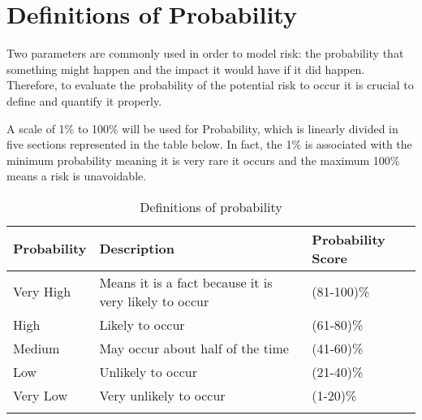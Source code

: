 \section{Definitions of Probability}
\label{3.1}
Two parameters are commonly used in order to model risk: the probability that something might happen and the impact it would have if it did happen. Therefore, to evaluate the probability of the potential risk to occur it is crucial to define and quantify it properly. 

A scale of 1\% to 100\% will be used for Probability, which is linearly divided in five sections represented in the table below. In fact, the 1\% is associated with the minimum probability meaning it is very rare it occurs and the maximum 100\% means a risk is unavoidable. 

\begin{longtable}[H]{l >{\raggedright\arraybackslash}p{7.8cm} p{4cm}}
	
	\toprule[2pt]
	
	\textbf{Probability} &  \textbf{Description}  & \textbf{Probability Score} \\
	
	\midrule [1.5pt]
	\endhead
	
	Very High & Means it is a fact because it is very likely to occur & (81-100)\%
	\vspace{0.2cm} \\
	
	\midrule
	
	High & Likely to occur & (61-80)\%
	\vspace{0.2cm} \\
	
	\midrule
	
	Medium & May occur about half of the time & (41-60)\% 
	\vspace{0.2cm} \\

	\midrule

	Low & Unlikely to occur & (21-40)\% 
	\vspace{0.2cm} \\

	\midrule

	Very Low & Very unlikely to occur & (1-20)\% 
	\vspace{0.2cm} \\
		
	\bottomrule[2pt]
	
	\caption{Definitions of probability}

\end{longtable}